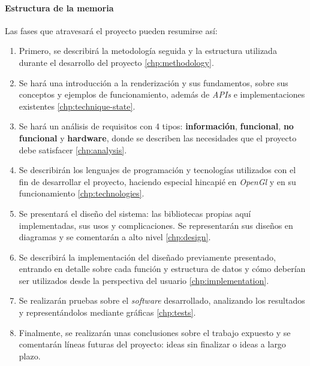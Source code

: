 \paragraph{Estructura de la memoria} Las fases que atravesará el proyecto pueden resumirse así:
\begin{enumerate}
    \item Primero, se describirá la metodología seguida y la estructura utilizada durante el desarrollo del proyecto \ref{chp:methodology}.
    
    \item Se hará una introducción a la renderización y sus fundamentos, sobre sus conceptos y ejemplos de funcionamiento, además de \textit{APIs} e implementaciones existentes \ref{chp:technique-state}.

    \item Se hará un análisis de requisitos con 4 tipos: \textbf{información}, \textbf{funcional}, \textbf{no funcional} y \textbf{hardware}, donde se describen las necesidades que el proyecto debe satisfacer \ref{chp:analysis}.

    \item Se describirán los lenguajes de programación y tecnologías utilizados con el fin de desarrollar el proyecto, haciendo especial hincapié en \textit{OpenGl} y en su funcionamiento \ref{chp:technologies}.
    
    \item Se presentará el diseño del sistema: las bibliotecas propias aquí implementadas, sus usos y complicaciones. Se representarán sus diseños en diagramas y se comentarán a alto nivel \ref{chp:design}.
    
    \item Se describirá la implementación del diseñado previamente presentado, entrando en detalle sobre cada función y estructura de datos y cómo deberían ser utilizados desde la perspectiva del usuario \ref{chp:implementation}.
    
    \item Se realizarán pruebas sobre el \textit{software} desarrollado, analizando los resultados y representándolos mediante gráficas \ref{chp:tests}.

    \item Finalmente, se realizarán unas conclusiones sobre el trabajo expuesto y se comentarán líneas futuras del proyecto: ideas sin finalizar o ideas a largo plazo. 
\end{enumerate}


